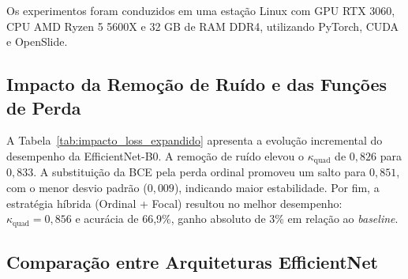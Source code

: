 Os experimentos foram conduzidos em uma estação Linux com GPU RTX 3060, CPU AMD Ryzen 5 5600X e 32 GB de RAM DDR4, utilizando PyTorch, CUDA e OpenSlide.

\subsection{Impacto da Remoção de Ruído e das Funções de Perda}

A Tabela~\ref{tab:impacto_loss_expandido} apresenta a evolução incremental do desempenho da EfficientNet-B0. A remoção de ruído elevou o $\kappa_{\text{quad}}$ de $0{,}826$ para $0{,}833$. A substituição da BCE pela perda ordinal promoveu um salto para $0{,}851$, com o menor desvio padrão ($0{,}009$), indicando maior estabilidade. Por fim, a estratégia híbrida (Ordinal + Focal) resultou no melhor desempenho: $\kappa_{\text{quad}} = 0{,}856$ e acurácia de 66,9\%, ganho absoluto de 3\% em relação ao \textit{baseline}.

\begin{table}[!htb]
	\centering
	\caption{Impacto da função de perda no desempenho da EfficientNet-B0.}
	\label{tab:impacto_loss_expandido}
\end{table}

\subsection{Comparação entre Arquiteturas EfficientNet}


